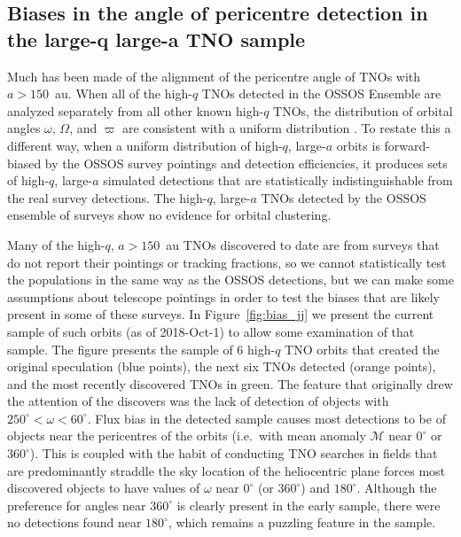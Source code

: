 \documentclass{aastex62}
\begin{document}

\subsection{Biases in the angle of pericentre detection in the large-q large-a TNO sample}

Much has been made of the alignment of the pericentre angle of TNOs
with $a>150$~au.  
When all of the high-$q$ TNOs detected in the OSSOS Ensemble are analyzed separately from all other known high-$q$ TNOs, the distribution of orbital angles $\omega$, $\Omega$, and $\varpi$ are consistent with a uniform distribution \citep{shankman17bias,bannister18}.
To restate this a different way, when a uniform distribution of high-$q$, large-$a$ orbits is forward-biased by the OSSOS survey pointings and detection efficiencies, it produces sets of high-$q$, large-$a$ simulated detections that are statistically indistinguishable from the real survey detections.
The high-$q$, large-$a$ TNOs detected by the OSSOS ensemble of surveys show no evidence for orbital clustering.

Many of the high-$q$, $a>150$~au TNOs discovered to date are from surveys that do not report their pointings or tracking fractions, so we cannot statistically test the populations in the same way as the OSSOS detections, but we can make some assumptions about telescope pointings in order to test the biases that are likely present in some of these surveys.
In Figure~\ref{fig:bias_jj} we present the current sample of such
orbits (as of 2018-Oct-1) to allow some examination of that sample.
The figure presents the sample of 6 high-$q$ TNO orbits that created the original
speculation (blue points), the next six TNOs detected (orange
points), and the most recently discovered TNOs in green.  The feature
that originally drew the attention of the discovers \citep{trujillosheppard14} was the lack of detection of
objects with $250^{\circ}< \omega < 60^{\circ}$.  Flux bias in the detected sample
causes most detections to be of objects near the pericentres of the
orbits (i.e.\ with mean anomaly $\mathcal{M}$ near $0^{\circ}$ or $360^{\circ}$).  This is coupled with the
habit of conducting TNO searches in fields that are predominantly
straddle the sky location of the heliocentric plane forces most
discovered objects to have values of $\omega$ near $0^{\circ}$ (or $360^{\circ}$) and $180^{\circ}$.
Although the preference for angles near $360^{\circ}$ is clearly present in the
early sample, there were no detections found near $180^{\circ}$, which remains a puzzling
feature in the sample.
\end{document}
